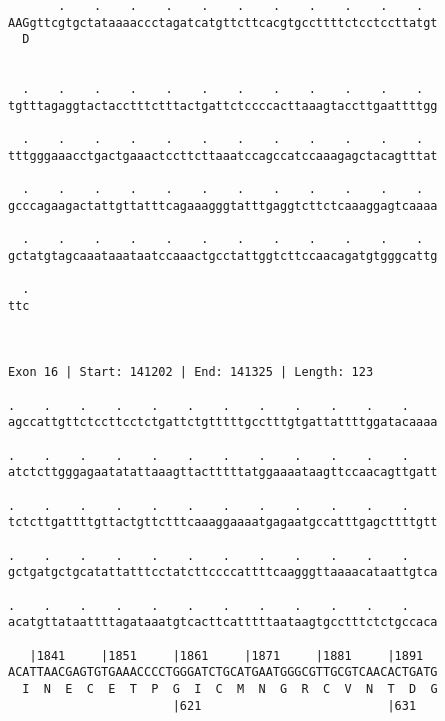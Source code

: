 \documentclass{article}
\begin{document}
\begin{Verbatim}
       .    .    .    .    .    .    .    .    .    .    .  
AAGgttcgtgctataaaaccctagatcatgttcttcacgtgccttttctcctccttatgt
  D                                                         
                                                            
  
  .    .    .    .    .    .    .    .    .    .    .    .  
tgtttagaggtactacctttctttactgattctccccacttaaagtaccttgaattttgg
                                                            
  .    .    .    .    .    .    .    .    .    .    .    .  
tttgggaaacctgactgaaactccttcttaaatccagccatccaaagagctacagtttat
                                                            
  .    .    .    .    .    .    .    .    .    .    .    .  
gcccagaagactattgttatttcagaaagggtatttgaggtcttctcaaaggagtcaaaa
                                                            
  .    .    .    .    .    .    .    .    .    .    .    .  
gctatgtagcaaataaataatccaaactgcctattggtcttccaacagatgtgggcattg
                                                            
  .
ttc
   
   
 
Exon 16 | Start: 141202 | End: 141325 | Length: 123
 
.    .    .    .    .    .    .    .    .    .    .    .    
agccattgttctccttcctctgattctgtttttgcctttgtgattattttggatacaaaa
                                                            
.    .    .    .    .    .    .    .    .    .    .    .    
atctcttgggagaatatattaaagttactttttatggaaaataagttccaacagttgatt
                                                            
.    .    .    .    .    .    .    .    .    .    .    .    
tctcttgattttgttactgttctttcaaaggaaaatgagaatgccatttgagcttttgtt
                                                            
.    .    .    .    .    .    .    .    .    .    .    .    
gctgatgctgcatattatttcctatcttccccattttcaagggttaaaacataattgtca
                                                            
.    .    .    .    .    .    .    .    .    .    .    .    
acatgttataattttagataaatgtcacttcatttttaataagtgcctttctctgccaca
                                                            
   |1841     |1851     |1861     |1871     |1881     |1891  
ACATTAACGAGTGTGAAACCCCTGGGATCTGCATGAATGGGCGTTGCGTCAACACTGATG
  I  N  E  C  E  T  P  G  I  C  M  N  G  R  C  V  N  T  D  G
                       |621                          |631   
  

\end{Verbatim}
\end{document}
